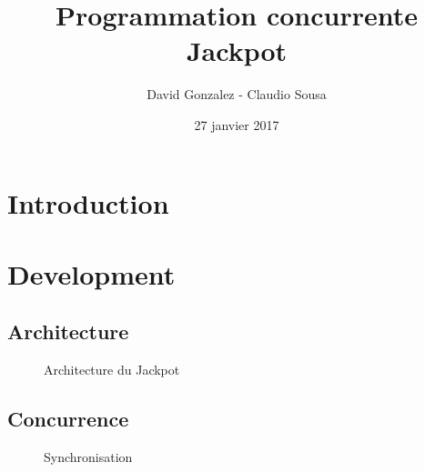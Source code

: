 \documentclass[11pt, a4paper]{article}
\begin{document}
\title
{
    \Huge{Programmation concurrente} \\
    \Huge{Jackpot}
}
\author
{
    \LARGE{David Gonzalez - Claudio Sousa}
}
\date{27 janvier 2017}
\maketitle

\begin{center}
\end{center}

\thispagestyle{empty}

\newpage

\section{Introduction}



\newpage

\section{Development}
\subsection{Architecture}

\begin{figure}[H]
    \begin{center}
    \end{center}
    \caption{Architecture du Jackpot}
    \label{Architecture du Jackpot}
\end{figure}

\newpage



\subsection{Concurrence}

\begin{figure}[H]
    \begin{center}
    \end{center}
    \caption{Synchronisation}
    \label{Synchronisation}
\end{figure}
\end{document}
